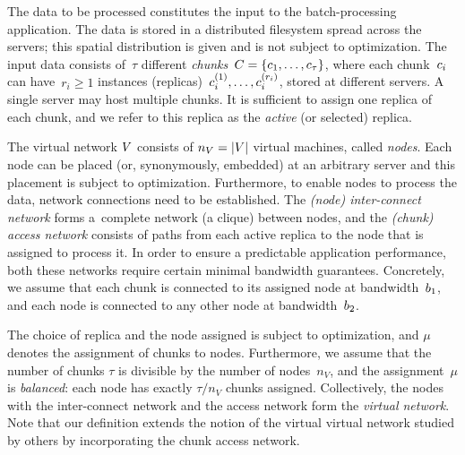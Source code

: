  The data to be processed constitutes the input to the batch-processing application.
The data is stored in a distributed filesystem spread across the servers; this spatial distribution is given and is not subject to optimization.
The input data consists of~$\tau$ different \emph{chunks}~${C = \{ c_1, \ldots, c_{\tau} \}}$,
where each chunk~$c_i$ can have~$r_i\geq 1$ instances (replicas)~$c_{i}^{(1)},\ldots, c_{i}^{(r_i)}$,
 stored at different servers. A single server may host multiple chunks.
It is sufficient to assign one replica of each chunk, and we refer to this
replica as the \emph{active} (or selected) replica.

 The virtual network $V$ consists of $n_V=|V|$ virtual machines, called \emph{nodes}.
Each node can be placed (or, synonymously, embedded) at an arbitrary server and this placement is subject
to optimization.
Furthermore, to enable nodes to process the data, network connections need to be established.
The \emph{(node) inter-connect network} forms a~complete network (a clique) between nodes,
and the \emph{(chunk) access network} consists of paths from each active replica to the node that is assigned to process it.
In order to ensure a predictable application performance, both these networks require certain minimal bandwidth guarantees.
Concretely, we assume that each chunk
is connected to its assigned node at bandwidth~$b_1$, and each node is connected to any other node
at  bandwidth~$b_2$.

The choice of replica and the node assigned is subject to optimization, and
$\mu$ denotes the assignment of chunks to nodes.
Furthermore, we assume that the number of chunks $\tau$ is divisible by the number of nodes~$n_V$, and the assignment~$\mu$ is \emph{balanced}:
each node has exactly $\tau / n_V$ chunks assigned.
Collectively, the nodes with the inter-connect network and the access network form the \emph{virtual network}.
Note that our definition extends the notion of the virtual virtual network studied by others \cite{oktopus,MogPop12,infocom16,ccr15emb,proteus} by incorporating the chunk access network.


